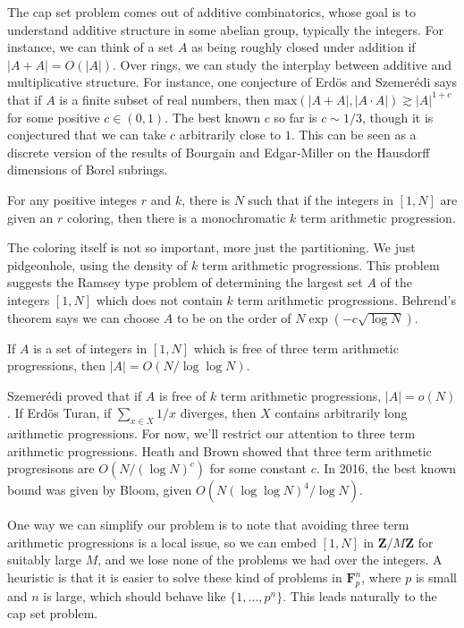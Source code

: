 The cap set problem comes out of additive combinatorics, whose goal is to understand additive structure in some abelian group, typically the integers. For instance, we can think of a set $A$  as being roughly closed under addition if $|A+A| = O(|A|)$. Over rings, we can study the interplay between additive and multiplicative structure. For instance, one conjecture of Erd\"{o}s and Szemer\'{e}di says that if $A$ is a finite subset of real numbers, then $\text{max}(|A+A|,|A \cdot A|) \gtrsim |A|^{1+c}$ for some positive $c \in (0,1)$. The best known $c$ so far is $c \sim 1/3$, though it is conjectured that we can take $c$ arbitrarily close to $1$. This can be seen as a discrete version of the results of Bourgain and Edgar-Miller on the Hausdorff dimensions of Borel subrings.

\begin{theorem}
    For any positive integes $r$ and $k$, there is $N$ such that if the integers in $[1,N]$ are given an $r$ coloring, then there is a monochromatic $k$ term arithmetic progression.
\end{theorem}

The coloring itself is not so important, more just the partitioning. We just pidgeonhole, using the density of $k$ term arithmetic progressions. This problem suggests the Ramsey type problem of determining the largest set $A$ of the integers $[1,N]$ which does not contain $k$ term arithmetic progressions. Behrend's theorem says we can choose $A$ to be on the order of $N\exp(-c \sqrt{\log N})$.

\begin{theorem}[Roth - 1956] If $A$ is a set of integers in $[1,N]$ which is free of three term arithmetic progressions, then $|A| = O(N/\log \log N)$.
\end{theorem}

Szemer\'{e}di proved that if $A$ is free of $k$ term arithmetic progressions, $|A| = o(N)$. If Erd\"{o}s Turan, if $\sum_{x \in X} 1/x$ diverges, then $X$ contains arbitrarily long arithmetic progressions. For now, we'll restrict our attention to three term arithmetic progressions. Heath and Brown showed that three term arithmetic progresisons are $O(N/(\log N)^c)$ for some constant $c$. In 2016, the best known bound was given by Bloom, given $O(N(\log \log N)^4/\log N)$.

One way we can simplify our problem is to note that avoiding three term arithmetic progressions is a local issue, so we can embed $[1,N]$ in $\mathbf{Z}/M\mathbf{Z}$ for suitably large $M$, and we lose none of the problems we had over the integers. A heuristic is that it is easier to solve these kind of problems in $\mathbf{F}_p^n$, where $p$ is small and $n$ is large, which should behave like $\{ 1, \dots, p^n \}$. This leads naturally to the cap set problem.

